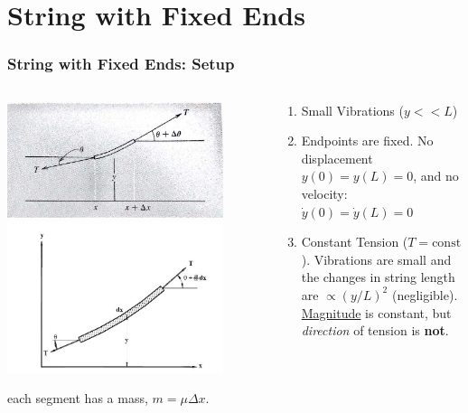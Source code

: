 \documentclass[pdf, hideothersubsections]{beamer}
\begin{document}
\section{String with Fixed Ends}
\begin{frame}
\frametitle{String with Fixed Ends: Setup}
\begin{columns}
  \begin{column}{0.4\textwidth}
    \includegraphics[width=0.85\textwidth]{StringFixedEnds.jpg}
    \pause
    \includegraphics[width=0.85\textwidth]{StringForceDiagram.png}
   
each segment has a mass, $m = \mu \Delta x$.
\pause
  \end{column}
  \begin{column}{0.6\textwidth}
    \begin{enumerate}
      \item Small Vibrations ($y << L$)
        \pause
      \item Endpoints are fixed. No displacement $y(0) = y(L) = 0$,
          and no velocity: $\dot{y}(0) = \dot{y}(L) = 0$
        \pause
      \item Constant Tension ($T = \mathrm{const}$). Vibrations are
        small and the changes in string length are $\propto (y/L)^2$
        (negligible). \underline{Magnitude} is constant, but
        \emph{direction} of tension is \textbf{not}.
    \end{enumerate}

  \end{column}
\end{columns}
\end{frame}
\end{document}

